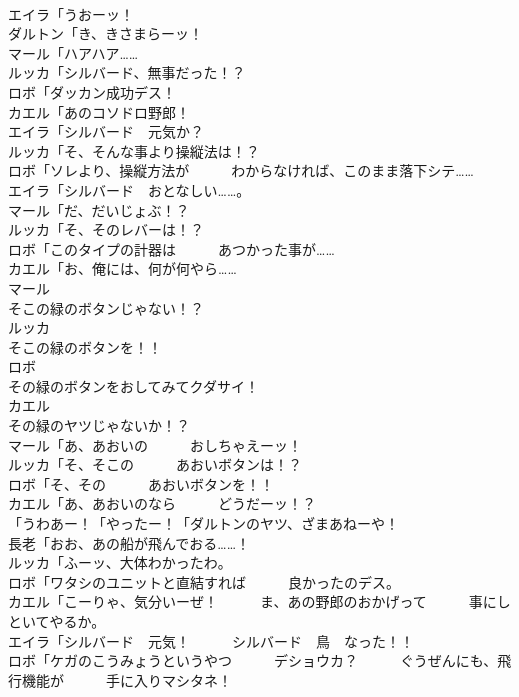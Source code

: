\documentclass[8pt]{extreport}
\begin{document}
\begin{CJK}{UTF8}{min}
\\	エイラ「うおーッ！	
\\	ダルトン「き、きさまらーッ！	
\\	マール「ハアハア……	
\\	ルッカ「シルバード、無事だった！？	
\\	ロボ「ダッカン成功デス！	
\\	カエル「あのコソドロ野郎！	
\\	エイラ「シルバード　元気か？	
\\	ルッカ「そ、そんな事より操縦法は！？	
\\	ロボ「ソレより、操縦方法が　　　わからなければ、このまま落下シテ……	
\\	エイラ「シルバード　おとなしい……。	
\\	マール「だ、だいじょぶ！？	
\\	ルッカ「そ、そのレバーは！？	
\\	ロボ「このタイプの計器は　　　あつかった事が……	
\\	カエル「お、俺には、何が何やら……	
\\	マール
\\	そこの緑のボタンじゃない！？	
\\	ルッカ
\\	そこの緑のボタンを！！	
\\	ロボ
\\	その緑のボタンをおしてみてクダサイ！	
\\	カエル
\\	その緑のヤツじゃないか！？	
\\	マール「あ、あおいの　　　おしちゃえーッ！	
\\	ルッカ「そ、そこの　　　あおいボタンは！？	
\\	ロボ「そ、その　　　あおいボタンを！！	
\\	カエル「あ、あおいのなら　　　どうだーッ！？	
\\	「うわあー！「やったー！「ダルトンのヤツ、ざまあねーや！	
\\	長老「おお、あの船が飛んでおる……！	
\\	ルッカ「ふーッ、大体わかったわ。	
\\	ロボ「ワタシのユニットと直結すれば　　　良かったのデス。	
\\	カエル「こーりゃ、気分いーぜ！　　　ま、あの野郎のおかげって　　　事にしといてやるか。	
\\	エイラ「シルバード　元気！　　　シルバード　鳥　なった！！	
\\	ロボ「ケガのこうみょうというやつ　　　デショウカ？　　　ぐうぜんにも、飛行機能が　　　手に入りマシタネ！	

\end{CJK}
\end{document}
